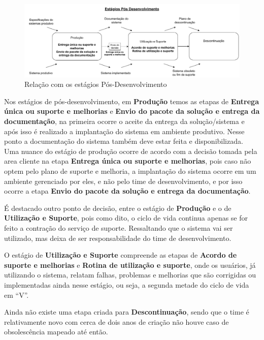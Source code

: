	\begin{figure}[h]
		\centering
		\includegraphics[width=\textwidth]{./figuras/currentPostDevelopment.pdf}
		\caption{Relação com os estágios Pós-Desenvolvimento}
		\label{fig:metodologia:currentPostDevelopmentPhases}
	\end{figure}

	Nos estágios de pós-desenvolvimento, em \textbf{Produção} temos as etapas de \textbf{Entrega única ou suporte e melhorias} e \textbf{Envio do pacote da solução e entrega da documentação},
	na primeira ocorre o aceite da entrega da solução/sistema e após isso é realizado a implantação do sistema em ambiente produtivo.
	Nesse ponto a documentação do sistema também deve estar feita e disponibilizada. Uma nuance do estágio de produção ocorre de acordo com a decisão tomada pela area cliente na etapa \textbf{Entrega única ou suporte e melhorias}, pois caso não optem
	pelo plano de suporte e melhoria, a implantação do sistema ocorre em um ambiente gerenciado por eles, e não pelo time de desenvolvimento, e por isso ocorre a etapa \textbf{Envio do pacote da solução e entrega da documentação}.

	É destacado outro ponto de decisão, entre o estágio de \textbf{Produção} e o de \textbf{Utilização e Suporte}, pois como dito, o ciclo de vida continua apenas se for feito a contração do serviço de suporte.
	Ressaltando que o sistema vai ser utilizado, mas deixa de ser responsabilidade do time de desenvolvimento.

	O estágio de \textbf{Utilização e Suporte} compreende as etapas de \textbf{Acordo de suporte e melhorias} e \textbf{Rotina de utilização e suporte}, onde os usuários, já utilizando o sistema, relatam falhas, problemas e melhorias que são corrigidas
	ou implementadas ainda nesse estágio, ou seja, a segunda metade do ciclo de vida em ``V''.

	Ainda não existe uma etapa criada para \textbf{Descontinuação}, sendo que o time é relativamente novo com cerca de dois anos de criação
	não houve caso de obsolescência mapeado até então.

